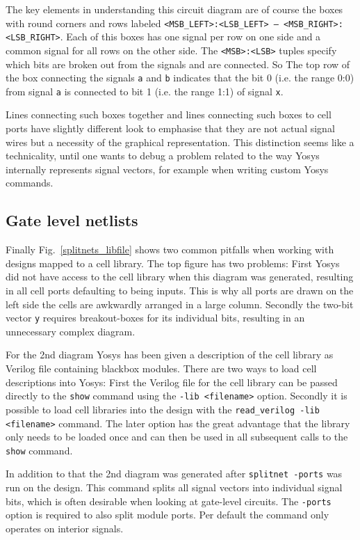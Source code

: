 \documentclass[9pt,technote,a4paper]{IEEEtran}
\begin{document}
The key elements in understanding this circuit diagram are of course the boxes
with round corners and rows labeled {\tt <MSB\_LEFT>:<LSB\_LEFT> -- <MSB\_RIGHT>:<LSB\_RIGHT>}.
Each of this boxes has one signal per row on one side and a common signal for all rows on the
other side. The {\tt <MSB>:<LSB>} tuples specify which bits are broken out from the signals
and are connected. So The top row of the box connecting the signals {\tt a} and {\tt b} indicates
that the bit 0 (i.e. the range 0:0) from signal {\tt a} is connected to bit 1 (i.e. the range
1:1) of signal {\tt x}.

Lines connecting such boxes together and lines connecting such boxes to cell
ports have slightly different look to emphasise that they are not actual signal
wires but a necessity of the graphical representation. This distinction seems
like a technicality, until one wants to debug a problem related to the way
Yosys internally represents signal vectors, for example when writing custom
Yosys commands.

\subsection{Gate level netlists}

Finally Fig.~\ref{splitnets_libfile} shows two common pitfalls when working
with designs mapped to a cell library. The top figure has two problems: First
Yosys did not have access to the cell library when this diagram was generated,
resulting in all cell ports defaulting to being inputs. This is why all ports
are drawn on the left side the cells are awkwardly arranged in a large column.
Secondly the two-bit vector {\tt y} requires breakout-boxes for its individual
bits, resulting in an unnecessary complex diagram.

For the 2nd diagram Yosys has been given a description of the cell library as
Verilog file containing blackbox modules. There are two ways to load cell
descriptions into Yosys: First the Verilog file for the cell library can be
passed directly to the {\tt show} command using the {\tt -lib <filename>}
option. Secondly it is possible to load cell libraries into the design with
the {\tt read\_verilog -lib <filename>} command. The later option has the great 
advantage that the library only needs to be loaded once and can then be used
in all subsequent calls to the {\tt show} command.

In addition to that the 2nd diagram was generated after {\tt splitnet -ports}
was run on the design. This command splits all signal vectors into individual
signal bits, which is often desirable when looking at gate-level circuits. The
{\tt -ports} option is required to also split module ports. Per default the
command only operates on interior signals.
\end{document}
